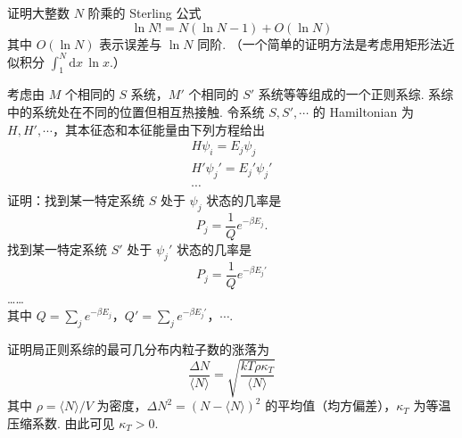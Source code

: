 \documentclass{assignment}
\begin{document}
\begin{prob}
    证明大整数 $N$ 阶乘的 Sterling 公式
    \[
        \ln N!=N(\ln N-1)+O(\ln N)
    \]
    其中 $O(\ln N)$ 表示误差与 $\ln N$ 同阶. （一个简单的证明方法是考虑用矩形法近似积分 $\int_1^N\mathrm{d}x\,\ln x$.）
\end{prob}
\begin{pf}
    
\end{pf}

\begin{prob}
    考虑由 $M$ 个相同的 $S$ 系统，$M'$ 个相同的 $S'$ 系统等等组成的一个正则系综. 系综中的系统处在不同的位置但相互热接触. 令系统 $S,S',\cdots$ 的 Hamiltonian 为 $H,H',\cdots$，其本征态和本征能量由下列方程给出
    \begin{gather*}
        H\psi_i=E_j\psi_j\\
        H'\psi_j'=E_j'\psi_j'\\
        \cdots
    \end{gather*}
    证明：找到某一特定系统 $S$ 处于 $\psi_j$ 状态的几率是
    \[
        P_j=\frac{1}{Q}e^{-\beta E_j}.
    \]
    找到某一特定系统 $S'$ 处于 $\psi_j'$ 状态的几率是
    \[
        P_j=\frac{1}{Q}e^{-\beta E_j'}
    \]
    ……\\
    其中 $Q=\sum_je^{-\beta E_j}$，$Q'=\sum_je^{-\beta E_j'}$，$\cdots$.
\end{prob}
\begin{pf}

\end{pf}

\begin{prob}
    证明局正则系综的最可几分布内粒子数的涨落为
    \[
        \frac{\Delta N}{\langle N\rangle}=\sqrt{\frac{kT\rho\kappa_T}{\langle N\rangle}}
    \]
    其中 $\rho=\langle N\rangle/V$ 为密度，$\Delta N^2=(N-\langle N\rangle)^2$ 的平均值（均方偏差），$\kappa_T$ 为等温压缩系数. 由此可见 $\kappa_T>0$.
\end{prob}
\begin{pf}
    
\end{pf}
\end{document}
